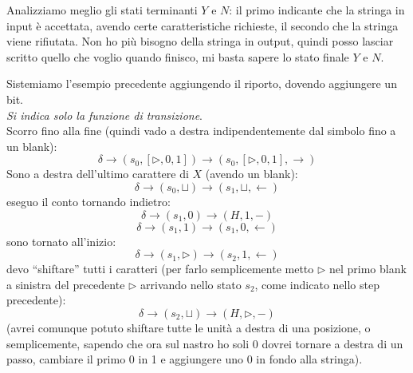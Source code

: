 Analizziamo meglio gli stati terminanti $Y$ e $N$: il primo indicante che la
stringa in input è accettata, avendo certe caratteristiche richieste, il secondo
che la stringa viene rifiutata. Non ho più bisogno della stringa in
output, quindi posso lasciar scritto quello che voglio quando finisco, mi basta
sapere lo stato finale $Y$ e $N$.
\begin{esempio}
  Sistemiamo l'esempio precedente aggiungendo il riporto, dovendo aggiungere un
  bit. \\
 \textit{Si indica solo la funzione di transizione}.\\
  Scorro fino alla fine (quindi vado a destra indipendentemente dal simbolo fino
  a un blank):
  \[\delta\to(s_0,[\triangleright, 0,1])\to(s_0,[\triangleright, 0,1],
    \rightarrow)\]
  Sono a destra dell'ultimo carattere di $X$ (avendo un blank):
  \[\delta\to(s_0,\sqcup)\to(s_1,\sqcup,\leftarrow)\]
  eseguo il conto tornando indietro:
  \[\delta\to(s_1,0)\to(H,1,-)\]
  \[\delta\to(s_1,1)\to(s_1,0,\leftarrow)\]
  sono tornato all'inizio:
  \[\delta\to(s_1,\triangleright)\to(s_2,1,\leftarrow)\]
  devo ``shiftare'' tutti i caratteri (per farlo semplicemente metto
  $\triangleright$ nel primo blank a sinistra del precedente $\triangleright$
  arrivando nello stato $s_2$, come indicato nello step precedente):
  \[\delta\to(s_2,\sqcup)\to(H,\triangleright,-)\]
  (avrei comunque potuto shiftare tutte le unità a destra di una posizione, o
  semplicemente, sapendo che ora sul nastro ho soli 0 dovrei tornare a destra di
  un passo, cambiare il primo 0 in 1 e aggiungere uno 0 in fondo alla
  stringa).
\end{esempio}
